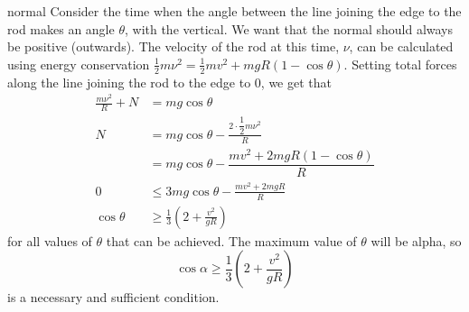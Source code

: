 \begin{solution}{normal}
Consider the time when the angle between the line joining the edge to the rod makes an angle $\theta$, with the vertical. We want that the normal should always be positive (outwards).
The velocity of the rod at this time, $\nu$, can be calculated using energy conservation $\frac{1}{2} m \nu^2 = \frac{1}{2}mv^2 + mgR(1-\cos \theta)$.
Setting total forces along the line joining the rod to the edge to $0$, we get that
\begin{align*}
\frac{m\nu^2}{R} + N &= mg \cos \theta \\
N &= mg \cos \theta - \frac{2\cdot \dfrac{1}{2}m\nu^2}{R}\\
&= mg \cos \theta - \dfrac{mv^2 + 2mgR(1-\cos \theta)}{R} \\
0 &\le 3mg \cos \theta - \frac{mv^2 + 2mgR}{R} \\
\cos \theta &\ge\frac{1}{3}\left(2+\frac{v^2}{gR}\right)
\end{align*}
for all values of $\theta$ that can be achieved. The maximum value of $\theta$ will be alpha, so 
\[\cos \alpha\ge\frac{1}{3}\left(2+\frac{v^2}{gR}\right)
\] is a necessary and sufficient condition.
\end{solution}
